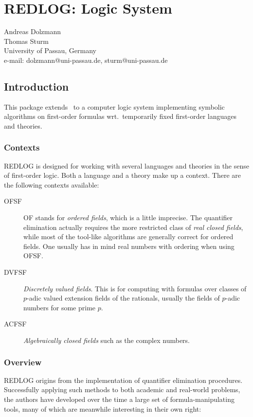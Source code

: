 \chapter{REDLOG: Logic System}
\label{REDLOG}


{\footnotesize
\begin{center}
Andreas Dolzmann \\
Thomas Sturm \\
University of Passau, Germany \\
e-mail: dolzmann@uni-passau.de, sturm@uni-passau.de
\end{center}
}

\section{Introduction}
This package extends \REDUCE\ to a computer logic system implementing
symbolic algorithms on first-order formulas wrt.~temporarily fixed
first-order languages and theories.

\subsection{Contexts}
REDLOG is designed for working with several languages and theories in
the sense of first-order logic. Both a language and a theory make up a
context. There are the following contexts available:
\begin{description}
\item[\textsc{OFSF}]
\textsc{OF} stands for \emph{ordered fields}, which is a little imprecise.
The quantifier elimination actually requires the more restricted class
of \emph{real closed fields}, while most of the tool-like algorithms
are generally correct for ordered fields. One usually has in mind real
numbers with ordering when using \textsc{OFSF}.

\item[\textsc{DVFSF}]
\emph{Discretely valued fields}. This is for computing with formulas
over classes of $p$-adic valued extension fields of the rationals,
usually the fields of $p$-adic numbers for some prime $p$.

\item[\textsc{ACFSF}]
\emph{Algebraically closed fields} such as the complex numbers.
\end{description}

\subsection{Overview}
REDLOG origins from the implementation of quantifier elimination
procedures. Successfully applying such methods to both academic and
real-world problems, the authors have developed over the time a large
set of formula-manipulating tools, many of which are meanwhile
interesting in their own right:

